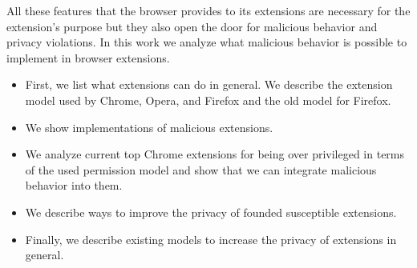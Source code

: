 \documentclass[article,colorback,accentcolor=tud9c,type=bsc]{tudthesis}
\begin{document}
	All these features that the browser provides to its extensions are necessary for the extension's purpose but they also open the door for malicious behavior and privacy violations. In this work we analyze what malicious behavior is possible to implement in browser extensions. 
	\begin{itemize}
		\itemsep-5px
		\item First, we list what extensions can do in general. We describe the extension model used by Chrome, Opera, and Firefox and the old model for Firefox.
		\item We show implementations of malicious extensions. 
		\item We analyze current top Chrome extensions for being over privileged in terms of the used permission model and show that we can integrate malicious behavior into them.
		\item We describe ways to improve the privacy of founded susceptible extensions. 
		\item Finally, we describe existing models to increase the privacy of extensions in general. 
	\end{itemize}
	
	








	
\end{document}
